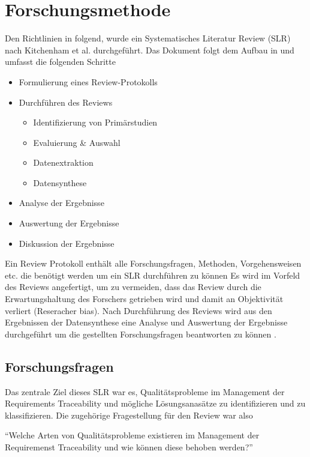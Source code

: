 \section{Forschungsmethode}
\label{sec:Forschungsmethode}
Den Richtlinien in \cite{Keele2007GuidelinesEngineering} folgend, wurde ein Systematisches Literatur Review (SLR) nach Kitchenham et al. durchgeführt. Das Dokument folgt dem Aufbau in \cite{Walia2009AErrors} und umfasst die folgenden Schritte 

\begin{itemize}
    \item Formulierung eines Review-Protokolls
    \item Durchführen des Reviews
        \begin{itemize}
            \item Identifizierung von Primärstudien
            \item Evaluierung \& Auswahl
            \item Datenextraktion
            \item Datensynthese
        \end{itemize}
    \item Analyse der Ergebnisse
    \item Auswertung der Ergebnisse
    \item Diskussion der Ergebnisse
\end{itemize}

Ein Review Protokoll enthält alle Forschungsfragen, Methoden, Vorgehensweisen etc. die benötigt werden um ein SLR durchführen zu können Es wird im Vorfeld des Reviews angefertigt, um zu vermeiden, dass das Review durch die Erwartungshaltung des Forschers getrieben wird und damit an Objektivität verliert (Reseracher bias). Nach Durchführung des Reviews wird aus den Ergebnissen der Datensynthese eine Analyse und Auswertung der Ergebnisse durchgeführt um die gestellten Forschungsfragen beantworten zu können \cite{Walia2009AErrors}.

\subsection{Forschungsfragen}

Das zentrale Ziel dieses SLR war es, Qualitätsprobleme im Management der Requirements Traceability und mögliche Lösungsanasätze zu identifizieren und zu klassifizieren. Die zugehörige Fragestellung für den Review war also


\enquote{Welche Arten von Qualitätsprobleme existieren im Management der Requiremenst Traceability und wie können diese behoben werden?}

